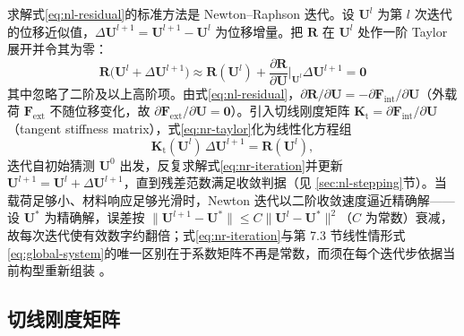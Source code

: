 求解式\eqref{eq:nl-residual}的标准方法是 Newton--Raphson 迭代。设 $\mathbf{U}^{l}$ 为第 $l$ 次迭代的位移近似值，$\Delta\mathbf{U}^{l+1}=\mathbf{U}^{l+1}-\mathbf{U}^{l}$ 为位移增量。把 $\mathbf{R}$ 在 $\mathbf{U}^{l}$ 处作一阶 Taylor 展开并令其为零：
\begin{equation}
  \mathbf{R}\bigl(\mathbf{U}^{l}+\Delta\mathbf{U}^{l+1}\bigr)
  \approx\mathbf{R}(\mathbf{U}^{l})
  +\frac{\partial\mathbf{R}}{\partial\mathbf{U}}\Big|_{\mathbf{U}^{l}}\Delta\mathbf{U}^{l+1}
  =\mathbf{0}
  \label{eq:nr-taylor}
\end{equation}
其中忽略了二阶及以上高阶项。由式\eqref{eq:nl-residual}，$\partial\mathbf{R}/\partial\mathbf{U}=-\partial\mathbf{F}_{\mathrm{int}}/\partial\mathbf{U}$（外载荷 $\mathbf{F}_{\mathrm{ext}}$ 不随位移变化，故 $\partial\mathbf{F}_{\mathrm{ext}}/\partial\mathbf{U}=\mathbf{0}$）。引入切线刚度矩阵 $\mathbf{K}_{\mathrm{t}}=\partial\mathbf{F}_{\mathrm{int}}/\partial\mathbf{U}$（tangent stiffness matrix），式\eqref{eq:nr-taylor}化为线性化方程组
\begin{equation}
  \mathbf{K}_{\mathrm{t}}(\mathbf{U}^{l})\,\Delta\mathbf{U}^{l+1}=\mathbf{R}(\mathbf{U}^{l}),
  \label{eq:nr-iteration}
\end{equation}迭代自初始猜测 $\mathbf{U}^{0}$ 出发，反复求解式\eqref{eq:nr-iteration}并更新 $\mathbf{U}^{l+1}=\mathbf{U}^{l}+\Delta\mathbf{U}^{l+1}$，直到残差范数满足收敛判据（见 \ref{sec:nl-stepping}节）。当载荷足够小、材料响应足够光滑时，Newton 迭代以二阶收敛速度逼近精确解——设 $\mathbf{U}^{\ast}$ 为精确解，误差按 $\lVert\mathbf{U}^{l+1}-\mathbf{U}^{\ast}\rVert\le C\lVert\mathbf{U}^{l}-\mathbf{U}^{\ast}\rVert^{2}$（$C$ 为常数）衰减，故每次迭代使有效数字约翻倍；式\eqref{eq:nr-iteration}与第 7.3 节线性情形式\eqref{eq:global-system}的唯一区别在于系数矩阵不再是常数，而须在每个迭代步依据当前构型重新组装 \cite{Hashim2020}。

\subsection{切线刚度矩阵}\label{sec:nl-tangent}

